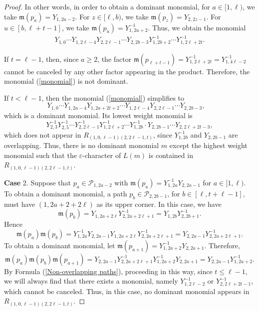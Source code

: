 \documentclass[11pt, reqno]{amsart}
\theoremstyle{plain}
\theoremstyle{definition}
\numberwithin{equation}{section}
\begin{document}
\begin{proof}
In other words, in order to obtain a dominant monomial, for $a\in[1,\ell)$, we take $\mathfrak{m}(p_a)=Y_{1,2a-2}$. For $z\in[\ell,b)$, we take $\mathfrak{m}(p_z)=Y_{2,2z-1}$. For $u\in[b, \ell+t-1]$, we take $\mathfrak{m}(p_u)=Y^{-1}_{1, 2u+2}$. Thus, we obtain the monomial 
\begin{align}\label{monomial}
Y_{1,0}\cdots Y_{1,2 \ell-4}Y_{2,2\ell-1}\cdots Y_{2,2b-3} Y^{-1}_{1,2b+2}\cdots Y^{-1}_{1,2 \ell+2t}.
\end{align}

If $t=\ell-1$, then, since $a\geq 2$, the factor $\mathfrak{m}(p_{\ell+t-1})=Y^{-1}_{1,2 \ell+2t}=Y^{-1}_{1,4 \ell-2}$ cannot be canceled by any other factor appearing in the product. Therefore, the monomial (\ref{monomial}) is not dominant.

If $t<\ell-1$, then the monomial (\ref{monomial}) simplifies to 
\[
Y_{1,0}\cdots Y_{1,2a-4}Y_{1,2a+2t+2}\cdots Y_{1,2\ell-4}Y_{2,2 \ell-1}\cdots Y_{2,2b-3}, \quad 
\]
which is a dominant monomial. Its lowest weight monomial is  
\[
Y^{-1}_{2,3} Y^{-1}_{2,5}\cdots Y^{-1}_{2,2 \ell-1} Y^{-1}_{1,2 \ell+2}\cdots Y^{-1}_{1,2b} \cdot Y_{2,2b-1}\cdots Y_{2,2 \ell+2t-3},
\]
which does not appear in $R_{(1,0,\ell-1)(2,2\ell-1,t)}$, since $Y^{-1}_{1,2b}$ and $Y_{2,2b-1}$ are overlapping. Thus, there is no dominant monomial $m$ except the highest weight monomial such that the $\varepsilon$-character of $L(m)$ is contained in $R_{(1,0,\ell-1)(2,2\ell-1,t)}$.


{\bf Case} 2. Suppose that $p_a\in \mathscr{P}_{1,2a-2}$ with $\mathfrak{m}(p_a)=Y^{-1}_{1,2a}Y_{2,2a-1}$ for $a\in[1, \ell)$. To obtain a dominant monomial, a path $p_b\in \mathscr{P}_{2,2b-1}$, for $b\in[\ell,t+\ell-1]$, must have $(1,2a+2+2 \ell)$ as its upper corner. In this case, we have 
\[
\mathfrak{m}(p_b)=Y_{1,2a+2 \ell}Y^{-1}_{2,2a+2 \ell+1}=Y_{1,2b}Y^{-1}_{2, 2b+1}.
\]
Hence
\[
\mathfrak{m}(p_a)\mathfrak{m}(p_b)=Y^{-1}_{1,2a}Y_{2,2a-1}Y_{1,2a+2 \ell}Y^{-1}_{2,2a+2 \ell+1}=Y_{2,2a-1}Y^{-1}_{2,2a+2 \ell+1}.
\]
To obtain a dominant monomial, let $\mathfrak{m}(p_{a+1})=Y^{-1}_{1,2a+2}Y_{2,2a+1}$. Therefore,
\[
\mathfrak{m}(p_a)\mathfrak{m}(p_b)\mathfrak{m}(p_{a+1})=Y_{2,2a-1}Y^{-1}_{2,2a+2 \ell+1}Y^{-1}_{1,2a+2}Y_{2,2a+1}=Y_{2,2a-1}Y^{-1}_{1,2a+2}.
\]
By Formula (\ref{Non-overlapping paths}), proceeding in this way, since $t\leq \ell-1$, we will always find that there exists a monomial, namely $Y^{-1}_{1,2 \ell-2}$ or $Y^{-1}_{2,2\ell+2t-1}$, which cannot be canceled. Thus, in this case, no dominant monomial appears in $R_{(1,0,\ell-1)(2,2\ell-1,t)}$.


\end{proof}
\end{document}
